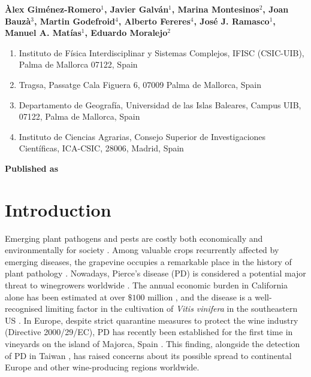 \vspace{1cm}

\textbf{Àlex Giménez-Romero$^{1}$, Javier Galván$^{1}$, Marina
    Montesinos$^{2}$, Joan Bauzà$^{3}$, Martin Godefroid$^{4}$, Alberto
    Fereres$^{4}$, José J. Ramasco$^{1}$, Manuel A. Matías$^{1}$, Eduardo
    Moralejo$^{2}$}

\vspace{1cm}

\begin{enumerate}
    \small
    \item Instituto de Física Interdisciplinar y Sistemas Complejos, IFISC
          (CSIC-UIB), Palma de Mallorca 07122, Spain
    \item Tragsa, Passatge Cala Figuera 6, 07009 Palma de Mallorca, Spain
    \item Departamento de Geografía, Universidad de las Islas Baleares, Campus
          UIB, 07122, Palma de Mallorca, Spain
    \item Instituto de Ciencias Agrarias, Consejo Superior de Investigaciones
          Científicas, ICA-CSIC, 28006, Madrid, Spain
\end{enumerate}

\vspace{1cm}

\textbf{Published as}

\vspace{0.5cm}


\newpage
\section{Introduction}
Emerging plant pathogens and pests are costly both economically and
environmentally for society \cite{Carvajal2019,
    Mooney2001,Pimentel2000,Spence2020}. Among valuable crops recurrently
affected
by emerging diseases, the grapevine occupies a remarkable place in the history
of plant pathology \cite{Borkarbook, Brewer2010, Rouxel2014, Tello2019}.
Nowadays, Pierce's disease (PD) is considered a potential major threat to
winegrowers worldwide \cite{Hopkins2002}. The annual economic burden in
California alone has been estimated at over $\$ 100$ million \cite{Tumber2014},
and the disease is a well-recognised limiting factor in the cultivation of
\textit{Vitis vinifera} in the southeastern US \cite{Hopkins2002}. In Europe,
despite strict quarantine measures to protect the wine industry (Directive
2000/29/EC), PD has recently been established for the first time in vineyards
on the island of Majorca, Spain \cite{Gomila2019, Moralejo2019}. This finding,
alongside the detection of PD in Taiwan \cite{Su2013}, has raised concerns
about its possible spread to continental Europe and other wine-producing
regions worldwide.

